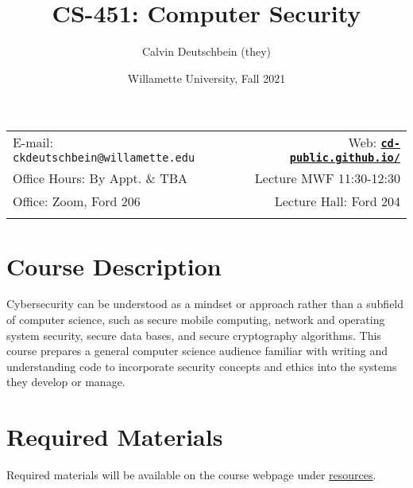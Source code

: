 \documentclass[11pt]{article}
\title{CS-451: Computer Security}
\author{Calvin Deutschbein (they)}
\date{Willamette University, Fall 2021}
\newcommand{\blankline}{\quad\pagebreak[2]}
\begin{document}
\maketitle

\blankline

\begin{tabular*}{.93\textwidth}{@{\extracolsep{\fill}}lr}


E-mail: \texttt{ckdeutschbein@willamette.edu} & Web: \href{https://cd-public.github.io/courses/computer_security/451f21.html}{\tt\bf cd-public.github.io/}  \\

 Office Hours: By Appt. \& TBA  &  Lecture MWF 11:30-12:30 \\

 Office: Zoom, Ford 206 & Lecture Hall: Ford 204 \\
 & \\
\hline
\end{tabular*}

\vspace{5 mm}


\section*{Course Description}

Cybersecurity can be understood as a mindset or approach rather than a subfield of computer science, such as secure mobile computing, network and operating system security, secure data bases, and secure cryptography algorithms. This course prepares a general computer science audience familiar with writing and understanding code to incorporate security concepts and ethics into the systems they develop or manage.


\section*{Required Materials}

Required materials will be available on the course webpage under \href{https://cd-public.github.io/courses/computer_security/r-451f21.html}{resources}.
\end{document}
